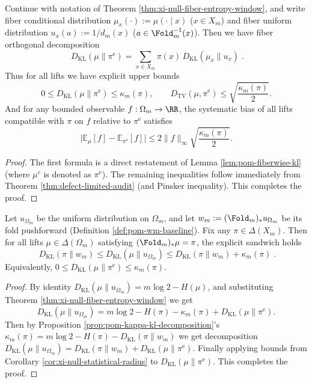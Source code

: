 \begin{corollary}\label{cor:xi-null-statistical-radius}
Continue with notation of Theorem \ref{thm:xi-null-fiber-entropy-window}, and write fiber conditional distribution \(\mu_x(\cdot):=\mu(\cdot\mid x)\) (\(x\in X_m\)) and fiber uniform distribution \(u_x(a):=1/d_m(x)\) (\(a\in\Fold_m^{-1}(x)\)).
Then we have fiber orthogonal decomposition
\[
\boxed{\;
D_{\mathrm{KL}}(\mu\|\pi^{\mathrm{e}})
=\sum_{x\in X_m}\pi(x)\,D_{\mathrm{KL}}(\mu_x\|u_x)\; }.
\]
Thus for all lifts we have explicit upper bounds
\[
0\le D_{\mathrm{KL}}(\mu\|\pi^{\mathrm{e}})\le \kappa_m(\pi),
\qquad
D_{\mathrm{TV}}(\mu,\pi^{\mathrm{e}})\le \sqrt{\frac{\kappa_m(\pi)}{2}}.
\]
And for any bounded observable \(f:\Omega_m\to\RR\), the systematic bias of all lifts compatible with \(\pi\) on \(f\) relative to \(\pi^{\mathrm{e}}\) satisfies
\[
\bigl|\mathbb{E}_\mu[f]-\mathbb{E}_{\pi^{\mathrm{e}}}[f]\bigr|
\le 2\|f\|_\infty\sqrt{\frac{\kappa_m(\pi)}{2}}.
\]
\end{corollary}

\begin{proof}
The first formula is a direct restatement of Lemma \ref{lem:pom-fiberwise-kl} (where \(\mu^e\) is denoted as \(\pi^{\mathrm{e}}\)).
The remaining inequalities follow immediately from Theorem \ref{thm:defect-limited-audit} (and Pinsker inequality). This completes the proof.
\end{proof}

\begin{corollary}\label{cor:xi-null-micro-kl-window}
Let \(u_{\Omega_m}\) be the uniform distribution on \(\Omega_m\), and let
\(
w_m:=(\Fold_m)_*u_{\Omega_m}
\)
be its fold pushforward (Definition \ref{def:pom-wm-baseline}).
Fix any \(\pi\in\Delta(X_m)\).
Then for all lifts \(\mu\in\Delta(\Omega_m)\) satisfying \((\Fold_m)_*\mu=\pi\), the explicit sandwich holds
\[
\boxed{\;
D_{\mathrm{KL}}(\pi\|w_m)
\le D_{\mathrm{KL}}(\mu\|u_{\Omega_m})
\le D_{\mathrm{KL}}(\pi\|w_m)+\kappa_m(\pi)\; }.
\]
Equivalently,
\(
0\le D_{\mathrm{KL}}(\mu\|\pi^{\mathrm{e}})\le \kappa_m(\pi)
\).
\end{corollary}

\begin{proof}
By identity \(D_{\mathrm{KL}}(\mu\|u_{\Omega_m})=m\log 2-H(\mu)\), and substituting Theorem \ref{thm:xi-null-fiber-entropy-window} we get
\[
D_{\mathrm{KL}}(\mu\|u_{\Omega_m})
=m\log 2-H(\pi)-\kappa_m(\pi)+D_{\mathrm{KL}}(\mu\|\pi^{\mathrm{e}}).
\]
Then by Proposition \ref{prop:pom-kappa-kl-decomposition}'s
\(
\kappa_m(\pi)=m\log 2-H(\pi)-D_{\mathrm{KL}}(\pi\|w_m)
\)
we get decomposition
\(
D_{\mathrm{KL}}(\mu\|u_{\Omega_m})
=D_{\mathrm{KL}}(\pi\|w_m)+D_{\mathrm{KL}}(\mu\|\pi^{\mathrm{e}})
\).
Finally applying bounds from Corollary \ref{cor:xi-null-statistical-radius} to \(D_{\mathrm{KL}}(\mu\|\pi^{\mathrm{e}})\). This completes the proof.
\end{proof}

